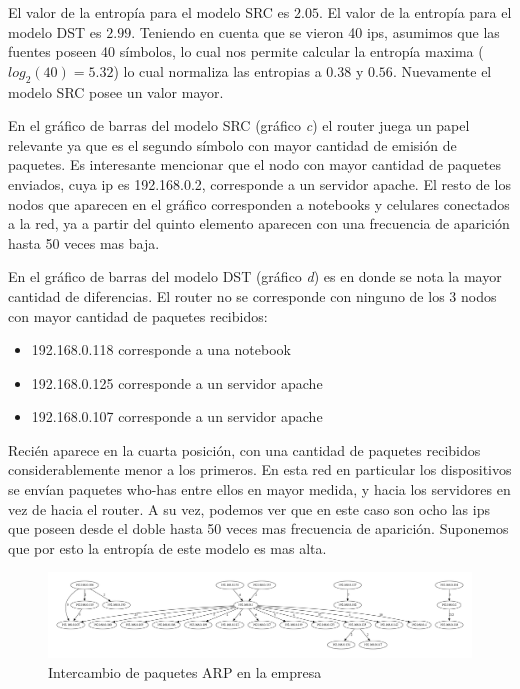 El valor de la entropía para el modelo SRC es $2.05$. El valor de la entropía
para el modelo DST es $2.99$. Teniendo en cuenta que se vieron 40 ips, 
asumimos que las fuentes poseen 40 s\'imbolos, lo cual nos permite 
calcular la entrop\'ia maxima ($log_2(40)=5.32$) lo cual normaliza las 
entropias a $0.38$ y $0.56$. Nuevamente el modelo SRC posee un valor mayor.

En el gráfico de barras del modelo SRC (gr\'afico \emph{c}) el router juega
un papel relevante
ya que es el segundo símbolo con mayor cantidad de emisión de paquetes. Es
interesante mencionar que el nodo con mayor cantidad de paquetes enviados, 
cuya ip es 192.168.0.2, corresponde a un servidor apache. 
El resto de los nodos que aparecen en el gráfico corresponden a notebooks
y celulares conectados a la red, ya a partir del quinto elemento aparecen
con una frecuencia de aparici\'on hasta 50 veces mas baja.

En el gráfico de barras del modelo DST (gr\'afico \emph{d}) es en donde se nota
la mayor cantidad de diferencias. El router no se corresponde con ninguno de los
3 nodos con mayor cantidad de paquetes recibidos:

\begin{itemize}
    \item 192.168.0.118 corresponde a una notebook
    \item 192.168.0.125 corresponde a un servidor apache
    \item 192.168.0.107 corresponde a un servidor apache
\end{itemize}

Recién aparece en la cuarta posición, con una cantidad de paquetes recibidos
considerablemente menor a los primeros. En esta red en particular los
dispositivos se envían paquetes who-has entre ellos en mayor medida, y hacia
los servidores en vez de hacia el router. A su vez, podemos ver que en este
caso son ocho las ips que poseen desde el doble hasta 50 veces mas frecuencia
de aparici\'on. Suponemos que por esto la entrop\'ia de este modelo es mas alta.

\begin{figure}[H]
	\center
	\includegraphics[scale=0.3]{resultados/empresa/conectividad.pdf}
	\caption{Intercambio de paquetes ARP en la empresa}
\end{figure}



